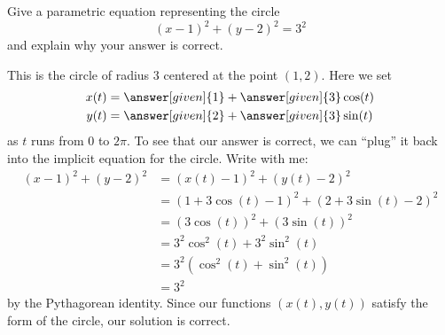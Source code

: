 \documentclass{ximera}
\begin{document}
\begin{example}
  Give a parametric equation representing the circle
  \[
  (x-1)^2 + (y-2)^2 = 3^2
  \]
  and explain why your answer is correct.
  \begin{explanation}
    This is the circle of radius $3$ centered at the point
    $(1,2)$. Here we set
    \begin{align*}
      x(t) &= \answer[given]{1} + \answer[given]{3}\cos(t)\\
      y(t) &= \answer[given]{2} + \answer[given]{3}\sin(t)
    \end{align*}
    as $t$ runs from $0$ to $2\pi$.  To see that our answer is
    correct, we can ``plug'' it back into the implicit equation
    for the circle. Write with me:
    \begin{align*}
      (x-1)^2 + (y-2)^2 &= (x(t)-1)^2 + (y(t)-2)^2\\
      &= (1 + 3\cos(t)-1)^2 + (2 + 3\sin(t)-2)^2\\
      &= (3\cos(t))^2 + (3\sin(t))^2\\
      &= 3^2\cos^2(t) + 3^2\sin^2(t)\\
      &= 3^2(\cos^2(t) + \sin^2(t))\\
      &= 3^2
    \end{align*}
    by the Pythagorean identity. Since our
    functions $(x(t),y(t))$ satisfy the form of the circle, our
    solution is correct.
  \end{explanation}
\end{example}
\end{document}
